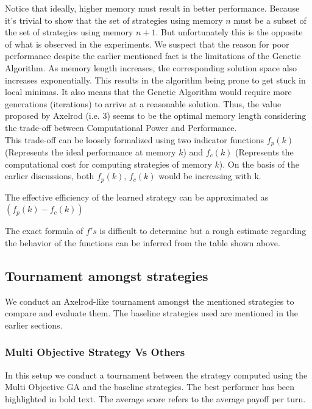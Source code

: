 \documentclass[a4paper]{article}
\begin{document}
	Notice that ideally, higher memory must result in better performance. Because it's trivial to show that the set of strategies using memory $n$ must be a subset of the set of strategies using memory $n+1$. But unfortunately this is the opposite of what is observed in the experiments. We suspect that the reason for poor performance despite the earlier mentioned fact is the limitations of the Genetic Algorithm. As memory length increases, the corresponding solution space also increases exponentially. This results in the algorithm being prone to get stuck in local minimas. It also means that the Genetic Algorithm would require more generations (iterations) to arrive at a reasonable solution. Thus, the value proposed by Axelrod (i.e. 3) seems to be the optimal memory length considering the trade-off between Computational Power and Performance.\\
	
	This trade-off can be loosely formalized using two indicator functions $f_{p}(k)$ (Represents the ideal performance at memory $k$) and $f_{c}(k)$ (Represents the computational cost for computing strategies of memory $k$). On the basis of the earlier discussions, both $f_{p}(k)$, $f_{c}(k)$ would be increasing with k.
	
	\noindent
	The effective efficiency of the learned strategy can be approximated as $(f_{p}(k) - f_{c}(k))$
	 
	 The exact formula of $f's$ is difficult to determine but a rough estimate regarding the behavior of the functions can be inferred from the table shown above. 

	\subsection{Tournament amongst strategies}

	We conduct an Axelrod-like tournament amongst the mentioned strategies to compare and evaluate them. The baseline strategies used are mentioned in the earlier sections.

	\subsubsection{Multi Objective Strategy Vs Others}

	In this setup we conduct a tournament between the strategy computed using the Multi Objective GA and the baseline strategies. The best performer has been highlighted in bold text. The average score refers to the average payoff per turn.
\end{document}
